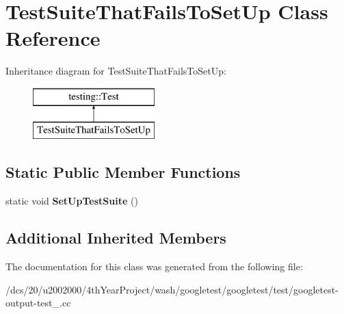 \hypertarget{classTestSuiteThatFailsToSetUp}{}\section{Test\+Suite\+That\+Fails\+To\+Set\+Up Class Reference}
\label{classTestSuiteThatFailsToSetUp}
Inheritance diagram for Test\+Suite\+That\+Fails\+To\+Set\+Up\+:\begin{figure}[H]
\begin{center}
\leavevmode
\includegraphics[height=2.000000cm]{classTestSuiteThatFailsToSetUp}
\end{center}
\end{figure}
\subsection*{Static Public Member Functions}
\begin{DoxyCompactItemize}
\item 
\mbox{\label{classTestSuiteThatFailsToSetUp_ae442fc7724a2c6fc62bcc07afa3dd69c}} 
static void {\bfseries Set\+Up\+Test\+Suite} ()
\end{DoxyCompactItemize}
\subsection*{Additional Inherited Members}


The documentation for this class was generated from the following file\+:\begin{DoxyCompactItemize}
\item 
/dcs/20/u2002000/4th\+Year\+Project/wash/googletest/googletest/test/googletest-\/output-\/test\+\_\+.\+cc\end{DoxyCompactItemize}
